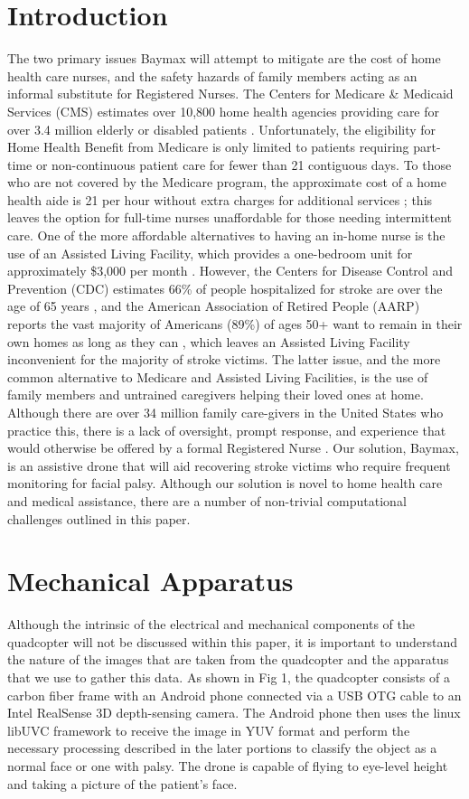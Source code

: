 \documentclass[12pt, conference]{IEEEtran}
\begin{document}
\section{Introduction}
The two primary issues Baymax will attempt to mitigate are the cost of home health care nurses, and the safety hazards of family members acting as an informal substitute for Registered Nurses. The Centers for Medicare \& Medicaid Services (CMS) estimates over 10,800 home health agencies providing care for over 3.4 million elderly or disabled patients \cite{7}. Unfortunately, the eligibility for Home Health Benefit from Medicare is only limited to patients requiring part-time or non-continuous patient care for fewer than 21 contiguous days\cite{8}. To those who are not covered by the Medicare program, the approximate cost of a home health aide is 21 per hour without extra charges for additional services \cite{9}; this leaves the option for full-time nurses unaffordable for those needing intermittent care. One of the more affordable alternatives to having an in-home nurse is the use of an Assisted Living Facility, which provides a one-bedroom unit for approximately \$3,000 per month \cite{9}. However, the Centers for Disease Control and Prevention (CDC) estimates 66\% of people hospitalized for stroke are over the age of 65 years \cite{10}, and the American Association of Retired People (AARP) reports the vast majority of Americans (89\%) of ages 50+ want to remain in their own homes as long as they can \cite{6}, which leaves an Assisted Living Facility inconvenient for the majority of stroke victims. The latter issue, and the more common alternative to Medicare and Assisted Living Facilities, is the use of family members and untrained caregivers helping their loved ones at home. Although there are over 34 million family care-givers in the United States \cite{6} who practice this, there is a lack of oversight, prompt response, and experience that would otherwise be offered by a formal Registered Nurse \cite{11}. Our solution, Baymax, is an assistive drone that will aid recovering stroke victims who require frequent monitoring for facial palsy. Although our solution is novel to home health care and medical assistance, there are a number of non-trivial computational challenges outlined in this paper.

\section{Mechanical Apparatus}
Although the intrinsic of the electrical and mechanical components of the quadcopter will not be discussed within this paper, it is important to understand the nature of the images that are taken from the quadcopter and the apparatus that we use to gather this data. As shown in Fig 1, the quadcopter consists of a carbon fiber frame with an Android phone connected via a USB OTG cable to an Intel RealSense 3D depth-sensing camera. The Android phone then uses the linux libUVC framework to receive the image in YUV format and perform the necessary processing described in the later portions to classify the object as a normal face or one with palsy. The drone is capable of flying to eye-level height and taking a picture of the patient’s face.
\end{document}
